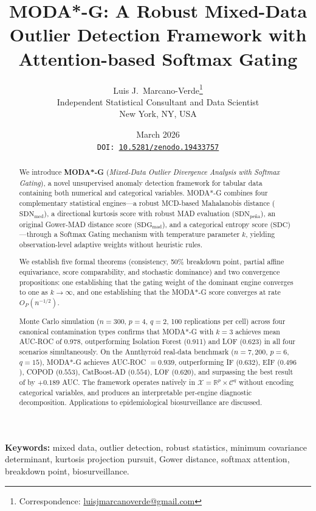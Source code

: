 \documentclass[11pt]{article}
\title{
  \textbf{MODA*-G: A Robust Mixed-Data Outlier Detection
  Framework with\\Attention-based Softmax Gating}
}
\author{
  Luis J.\ Marcano-Verde\thanks{
    Correspondence: \href{mailto:luisjmarcanoverde@gmail.com}
    {luisjmarcanoverde@gmail.com}}\\[4pt]
  \small Independent Statistical Consultant and Data Scientist\\
  \small New York, NY, USA
}
\date{March 2026\\[4pt]
  \small\texttt{DOI: \href{https://doi.org/10.5281/zenodo.19433757}{10.5281/zenodo.19433757}}}
\theoremstyle{plain}
\theoremstyle{definition}
\newcommand{\R}{\mathbb{R}}
\newcommand{\C}{\mathcal{C}}
\newcommand{\X}{\mathcal{X}}
\begin{document}
\maketitle

\begin{abstract}
We introduce \textbf{MODA*-G} (\emph{Mixed-Data Outlier
Divergence Analysis with Softmax Gating}), a novel
unsupervised anomaly detection framework for tabular data
containing both numerical and categorical variables.
MODA*-G combines four complementary statistical
engines---a robust MCD-based Mahalanobis distance
($\text{SDN}_\text{mcd}$), a directional kurtosis score
with robust MAD evaluation ($\text{SDN}_\text{pe\~{n}a}$),
an original Gower-MAD distance score
($\text{SDG}_\text{mad}$), and a categorical entropy score
($\text{SDC}$)---through a Softmax Gating mechanism with
temperature parameter $k$, yielding observation-level
adaptive weights without heuristic rules.

We establish five formal theorems (consistency, 50\%
breakdown point, partial affine equivariance, score
comparability, and stochastic dominance) and two
convergence propositions: one establishing that the gating
weight of the dominant engine converges to one as
$k \to \infty$, and one establishing that the MODA*-G
score converges at rate $O_P(n^{-1/2})$.

Monte Carlo simulation ($n{=}300$, $p{=}4$, $q{=}2$,
100 replications per cell) across four canonical
contamination types confirms that MODA*-G with $k{=}3$
achieves mean AUC-ROC of 0.978, outperforming Isolation
Forest (0.911) and LOF (0.623) in all four scenarios
simultaneously. On the Annthyroid real-data benchmark
\citep{campos2016} ($n{=}7{,}200$, $p{=}6$, $q{=}15$),
MODA*-G achieves AUC-ROC $= 0.939$, outperforming IF
($0.632$), EIF ($0.496$), COPOD ($0.553$), CatBoost-AD
($0.554$), LOF ($0.620$), and surpassing the best
result of \citet{campos2016} by $+0.189$ AUC.
The framework operates natively in
$\X = \R^p \times \C^q$ without encoding categorical
variables, and produces an interpretable per-engine
diagnostic decomposition. Applications to epidemiological
biosurveillance are discussed.
\end{abstract}

\noindent\textbf{Keywords:} mixed data, outlier detection,
robust statistics, minimum covariance determinant, kurtosis
projection pursuit, Gower distance, softmax attention,
breakdown point, biosurveillance.
\end{document}
